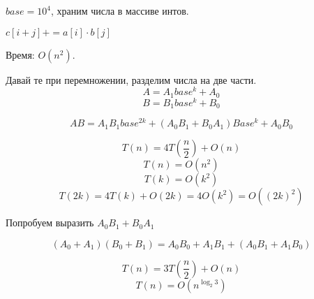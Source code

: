 $base = 10^4$, храним числа в массиве интов. 

$c[i + j] += a[i] \cdot b[j]$

Время: $O(n^2)$.

Давай те при перемножении, разделим числа на две части.
$$A = A_1 base^{k} + A_0$$
$$B = B_1 base^{k} + B_0$$

$$AB = A_1 B_1 base^{2k} + (A_0B_1 + B_0 A_1)Base^{k} + A_0B_0$$

$$T(n) = 4T(\frac{n}{2}) + O(n)$$
$$T(n) = O(n^2)$$
$$T(k) = O(k^2)$$
$$T(2k) = 4T(k) + O(2k) = 4O(k^2) = O((2k)^2)$$

Попробуем выразить $A_0B_1 + B_0 A_1$

$$(A_0 + A_1)(B_0 + B_1) = A_0B_0 + A_1B_1 + (A_0B_1 + A_1B_0)$$


$$T(n) = 3T(\frac{n}{2}) + O(n)$$
$$T(n) = O(n^{\log_{2}3})$$